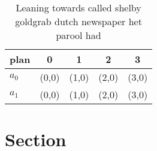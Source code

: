 \documentclass[a4paper]{article}
\begin{document}
\begin{table}
\begin{adjustbox}{width=0.5\columnwidth}
\begin{tabular}{|l|l|l|l|l|}
\hline
\textbf{plan} & \multicolumn{1}{c|}{\textbf{0}} & \multicolumn{1}{c|}{\textbf{1}} & \multicolumn{1}{c|}{\textbf{2}} & \multicolumn{1}{c|}{\textbf{3}} \\ \hline
\textbf{$a_0$}  & (0,0) & (1,0) & (2,0) & (3,0) \\ \hline
\textbf{$a_1$}  & (0,0) & (1,0) & (2,0) & (3,0) \\ \hline
\end{tabular}
\end{adjustbox}
\caption{Leaning towards called shelby goldgrab dutch newspaper het parool had
}
\end{table}

\section{Section}
\end{document}
